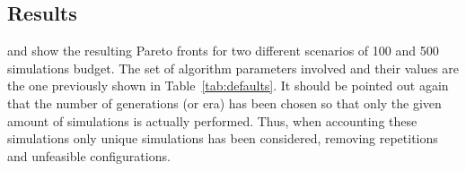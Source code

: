 %

\subsection{Results}

 and  show the
resulting Pareto fronts for two different scenarios of 100 and 500
simulations budget. The set of algorithm parameters involved and their
values are the one previously shown in Table~\ref{tab:defaults}. It
should be pointed out again that the number of generations (or era)
has been chosen so that only the given amount of simulations is
actually performed. Thus, when accounting these simulations only
unique simulations has been considered, removing repetitions and
unfeasible configurations.

